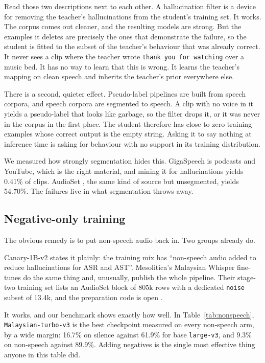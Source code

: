 \documentclass[preprint]{article}
\begin{document}
Read those two descriptions next to each other. A hallucination filter is a device for removing
the teacher's hallucinations from the student's training set. It works. The corpus comes out
cleaner, and the resulting models are strong. But the examples it deletes are precisely the
ones that demonstrate the failure, so the student is fitted to the subset of the teacher's
behaviour that was already correct. It never sees a clip where the teacher wrote
\texttt{thank you for watching} over a music bed. It has no way to learn that this is wrong. It
learns the teacher's mapping on clean speech and inherits the teacher's prior everywhere else.

There is a second, quieter effect. Pseudo-label pipelines are built from speech corpora, and
speech corpora are segmented to speech. A clip with no voice in it yields a pseudo-label that
looks like garbage, so the filter drops it, or it was never in the corpus in the first place.
The student therefore has close to zero training examples whose correct output is the empty
string. Asking it to say nothing at inference time is asking for behaviour with no support in
its training distribution.

We measured how strongly segmentation hides this. GigaSpeech \citep{chen2021gigaspeech} is
podcasts and YouTube, which is the right material, and mining it for hallucinations yields
0.41\% of clips. AudioSet \citep{gemmeke2017audioset}, the same kind of source but unsegmented,
yields 54.70\%. The failures live in what segmentation throws away.

\subsection{Negative-only training}

The obvious remedy is to put non-speech audio back in. Two groups already do.

Canary-1B-v2 \citep{sekoyan2025canaryv2} states it plainly: the training mix has ``non-speech
audio added to reduce hallucinations for ASR and AST''. Mesolitica's Malaysian Whisper
fine-tunes \citep{mesolitica2025malaysianwhisper} do the same thing and, unusually, publish the
whole pipeline. Their stage-two training set \citep{mesolitica2025stage2} lists an AudioSet
block of 805k rows with a dedicated \texttt{noise} subset of 13.4k, and the preparation code
is open \citep{malaysiaai2025pipeline}.

It works, and our benchmark shows exactly how well. In Table~\ref{tab:nonspeech},
\texttt{Malaysian-turbo-v3} is the best checkpoint measured on every non-speech arm, by a wide
margin: 16.7\% on silence against 61.9\% for base \texttt{large-v3}, and 9.3\% on non-speech
against 89.9\%. Adding negatives is the single most effective thing anyone in this table did.
\end{document}
